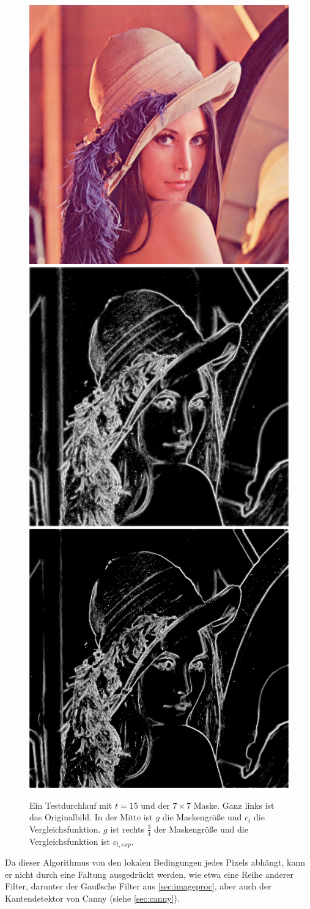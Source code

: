 \documentclass[a4paper, 11pt]{report}
\theoremstyle{definition}
\begin{document}
			\begin{figure}[H]\centering
				\includegraphics[width=.3\textwidth]{../examples/lena/lena.png}\quad
				\includegraphics[width=.3\textwidth]{../examples/lena/no-geom_raw.png}\quad
				\includegraphics[width=.3\textwidth]{../examples/lena/15_out_raw.png}
				\caption{Ein Testdurchlauf mit $t=15$ und der $7\times 7$ Maske. Ganz links ist das Originalbild. In der Mitte ist $g$ die Maskengröße und $c_t$ die Vergleichsfunktion. $g$ ist rechts $\frac{3}{4}$ der Maskengröße und die Vergleichsfunktion ist $c_{t,exp}$.}
				\label{fig:lena_first_test}
			\end{figure}

			Da dieser Algorithmus von den lokalen Bedingungen jedes Pixels abhängt, kann er nicht durch eine Faltung ausgedrückt werden, wie etwa eine Reihe anderer Filter, darunter der Gaußsche Filter aus \ref{sec:imageproc}, aber auch der Kantendetektor von Canny (siehe \ref{sec:canny}).
\end{document}
